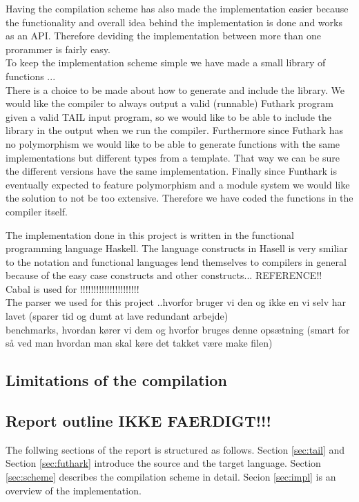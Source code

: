 \documentclass[11pt]{article}
\begin{document}
Having the compilation scheme has also made the implementation easier because the functionality and overall idea behind the implementation is done and works as an API. Therefore deviding the implementation between more than one prorammer is fairly easy. \\

To keep the implementation scheme simple we have made a small library of functions ...\\ %
There is a choice to be made about how to generate and include the library.
We would like the compiler to always output a valid (runnable) Futhark program given a valid TAIL input program, so we would like to
be able to include the library in the output when we run the compiler.
Furthermore since Futhark has no polymorphism we would like to be able to
generate functions with the same implementations but different types from a template.
That way we can be sure the different versions have the same implementation.
Finally since Funthark is eventually expected to feature polymorphism and a module system we would like the solution to not be too
extensive\cite{TroelsHenriksen}. Therefore we have coded the functions in the compiler itself.

The implementation done in this project is written in the functional programming language Haskell. The language constructs in Hasell is very smiliar to the notation and functional languages lend themselves to compilers in general because of the easy case constructs and other constructs... REFERENCE!! \\%

Cabal is used for !!!!!!!!!!!!!!!!!!!!!!\\

The parser we used for this project ..hvorfor bruger vi den og ikke en vi selv har lavet (sparer tid og dumt at lave redundant arbejde)\\

benchmarks, hvordan kører vi dem og hvorfor bruges denne opsætning (smart for så ved man hvordan man skal køre det takket være make filen)\\


\subsection{Limitations of the compilation}
% 

\subsection{Report outline IKKE FAERDIGT!!!}
The follwing sections of the report is structured as follows. Section \ref{sec:tail} and Section \ref{sec:futhark} introduce the source and the target language. Section \ref{sec:scheme} describes the compilation scheme in detail. Secion \ref{sec:impl} is an overview of the implementation.
\end{document}
